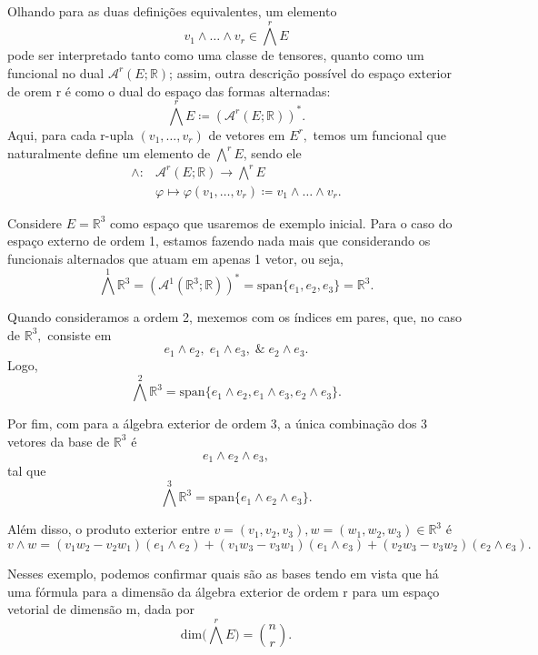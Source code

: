 \documentclass[../differential_forms.tex]{subfiles}
\begin{document}
Olhando para as duas definições equivalentes, um elemento
\[
	v_1\wedge\dotsc \wedge v_r\in \bigwedge^{r}E
\]
pode ser interpretado tanto como uma classe de tensores, quanto como um funcional no dual \(\mathcal{A}^{r}(E; \mathbb{R})\); assim, outra descrição
possível do espaço exterior de orem r é como o dual do espaço das formas alternadas:
\[
	\bigwedge^{r} E \coloneqq (\mathcal{A}^{r}(E; \mathbb{R}))^{*}.
\]
Aqui, para cada r-upla \((v_1, \dotsc , v_r)\) de vetores em \(E^{r},\) temos um funcional que naturalmente define um elemento de \(\bigwedge^{r}E\), sendo ele
\begin{align*}
	\wedge : & \mathcal{A}^{r}(E; \mathbb{R})\rightarrow \bigwedge^{r}E                              \\
	         & \varphi \longmapsto \varphi (v_1, \dotsc , v_r)\coloneqq v_1\wedge \dotsc \wedge v_r.
\end{align*}
\begin{example}
	Considere \(E = \mathbb{R}^{3}\) como espaço que usaremos de exemplo inicial. Para o caso do espaço externo de ordem 1, estamos fazendo nada mais que considerando
	os funcionais alternados que atuam em apenas 1 vetor, ou seja,
	\[
		\bigwedge^{1}\mathbb{R}^{3} = (\mathcal{A}^{1}(\mathbb{R}^{3}; \mathbb{R}))^* = \mathrm{span}\{e_1, e_2, e_3\} = \mathbb{R}^{3}.
	\]

	Quando consideramos a ordem 2, mexemos com os índices em pares, que, no caso de \(\mathbb{R}^{3},\) consiste em
	\[
		e_1 \wedge e_2,\; e_1 \wedge e_3,\;\&\; e_{2}\wedge e_3.
	\]
	Logo,
	\[
		\bigwedge^{2}\mathbb{R}^{3} = \mathrm{span}\{e_1\wedge e_2, e_1\wedge e_3, e_2\wedge e_3\}.
	\]

	Por fim, com para a álgebra exterior de ordem 3, a única combinação dos 3 vetores da base de \(\mathbb{R}^{3}\) é
	\[
		e_1 \wedge e_2 \wedge e_3,
	\]
	tal que
	\[
		\bigwedge^{3}\mathbb{R}^{3} = \mathrm{span}\{e_1 \wedge e_2\wedge e_3\}.
	\]

	Além disso, o produto exterior entre \(v=(v_1, v_2, v_3), w=(w_1, w_2, w_3)\in \mathbb{R}^{3}\) é
	\[
		v\wedge w = (v_1w_2 - v_2w_1)(e_1\wedge e_2) + (v_1w_3 - v_3w_1)(e_1\wedge e_3) + (v_2w_3-v_3w_2)(e_2\wedge e_3).
	\]
\end{example}

Nesses exemplo, podemos confirmar quais são as bases tendo em vista que há uma fórmula para a dimensão da álgebra exterior de ordem r para um espaço
vetorial de dimensão m, dada por
\[
	\mathrm{dim}\biggl(\bigwedge^{r}E\biggr) = \binom{n}{r}.
\]
\end{document}
